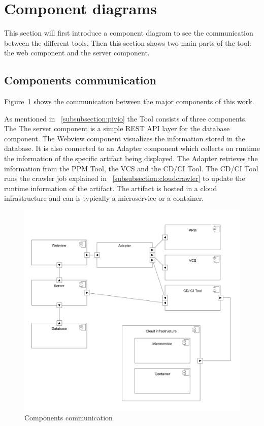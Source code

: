 \section{Component diagrams}

This section will first introduce a component diagram to see the communication between the different tools. Then this section shows two main parts of the tool: the web component and the server component.

\subsection{Components communication}
Figure~\ref{fig:component-diagram} shows the communication between the major components of this work.

As mentioned in ~\ref{subsubsection:pivio} the Tool consists of three components. The The server component is a simple REST API layer for the database component. The Webview component visualizes the information stored in the database. It is also connected to an Adapter component which collects on runtime the information of the specific artifact being displayed. The Adapter retrieves the information from the PPM Tool, the VCS and the CD/CI Tool.
The CD/CI Tool runs the crawler job explained in ~\ref{subsubsection:cloudcrawler} to update the runtime information of the artifact. The artifact is hosted in a cloud infrastructure and can is typically a microservice or a container.

\begin{figure}[htpb]
  \centering
  \includegraphics[width=1.0\textwidth]{figures/component-diagram.PNG}
  \caption{Components communication}
  \label{fig:component-diagram}
\end{figure} 


